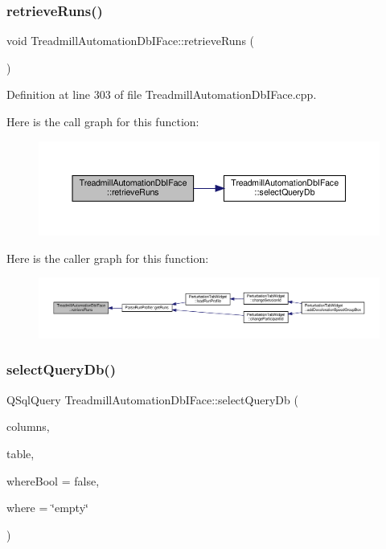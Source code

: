 \subsubsection{\texorpdfstring{retrieve\+Runs()}{retrieveRuns()}}
{\footnotesize\ttfamily void Treadmill\+Automation\+Db\+I\+Face\+::retrieve\+Runs (\begin{DoxyParamCaption}{ }\end{DoxyParamCaption})}



Definition at line 303 of file Treadmill\+Automation\+Db\+I\+Face.\+cpp.

Here is the call graph for this function\+:
\nopagebreak
\begin{figure}[H]
\begin{center}
\leavevmode
\includegraphics[width=350pt]{class_treadmill_automation_db_i_face_a0776350cdf604faa9570329a686d4b34_cgraph}
\end{center}
\end{figure}
Here is the caller graph for this function\+:
\nopagebreak
\begin{figure}[H]
\begin{center}
\leavevmode
\includegraphics[width=350pt]{class_treadmill_automation_db_i_face_a0776350cdf604faa9570329a686d4b34_icgraph}
\end{center}
\end{figure}
\mbox{\label{class_treadmill_automation_db_i_face_a4c750844b93ed48c48d76244fa40283e}} 
\subsubsection{\texorpdfstring{select\+Query\+Db()}{selectQueryDb()}}
{\footnotesize\ttfamily Q\+Sql\+Query Treadmill\+Automation\+Db\+I\+Face\+::select\+Query\+Db (\begin{DoxyParamCaption}\item[{Q\+String}]{columns,  }\item[{Q\+String}]{table,  }\item[{bool}]{where\+Bool = {\ttfamily false},  }\item[{Q\+String}]{where = {\ttfamily \char`\"{}empty\char`\"{}} }\end{DoxyParamCaption})}



